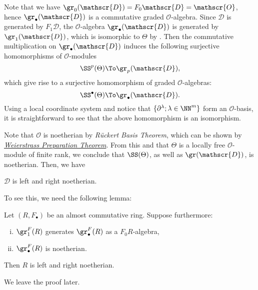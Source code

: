 Note that we have $\gr_0(\mathscr{D})=F_0\mathscr{D}=\mathscr{O}$, 
hence $\gr_\bullet(\mathscr{D})$ is a commutative graded $\mathscr{O}$-algebra. 
Since $\mathscr{D}$ is generated by $F_1\mathscr{D}$, the $\mathscr{O}$-algebra 
$\gr_\bullet(\mathscr{D})$ is generated by $\gr_1(\mathscr{D})$, 
which is isomorphic to $\Theta$ by . 
Then the commutative multiplication on $\gr_\bullet(\mathscr{D})$ induces 
the following surjective homomorphisms of $\mathscr{O}$-modules
\[
\SS^p(\Theta)\To\gr_p(\mathscr{D}),
\] 
which give rise to a surjective homomorphism of graded $\mathscr{O}$-algebras: 
\begin{equation}\label{eq:sym(theta)_to_D}
\SS^\bullet(\Theta)\To\gr_\bullet(\mathscr{D}).
\end{equation}
Using a local coordinate system and notice that 
$\{\partial^\lambda;\lambda\in\NN^m\}$ 
form an $\mathscr{O}$-basis, it is straightforward to see that 
the above homomorphism is an isomorphism.

Note that $\mathscr{O}$ is noetherian by \emph{R\"{u}ckert Basis Theorem}, 
which can be shown by 
\href{https://en.wikipedia.org/wiki/Weierstrass_preparation_theorem}
{\emph{Weierstrass Preparation Theorem}}. From this and that $\Theta$ 
is a locally free $\mathscr{O}$-module of finite rank, we conclude that 
$\SS(\Theta)$, as well as $\gr(\mathscr{D})$, is noetherian.
Then, we have
\begin{theorem}
$\mathscr{D}$ is left and right noetherian.
\end{theorem}
To see this, we need the following lemma:
\begin{lem}
Let $(R,F_\bullet)$ be an almost commutative ring. Suppose furthermore:
\begin{enumerate}[(i)]
\item $\gr^F_1(R)$ generates $\gr^F_\bullet(R)$ as a $F_0R$-algebra,
\item $\gr^F_\bullet(R)$ is noetherian.
\end{enumerate}
Then $R$ is left and right noetherian.
\end{lem}
We leave the proof later. 

